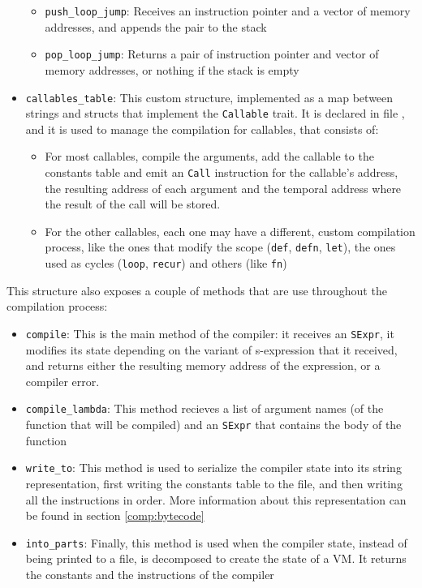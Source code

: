 \documentclass[11pt]{scrreprt}
\begin{document}
\begin{itemize}
\begin{itemize}
    \item \texttt{push\_loop\_jump}: Receives an instruction pointer and a vector of memory addresses, and appends the pair to the stack
    \item \texttt{pop\_loop\_jump}: Returns a pair of instruction pointer and vector of memory addresses, or nothing if the stack is empty
  \end{itemize}
  \item \texttt{callables\_table}: This custom structure, implemented as a map between strings and structs that implement the \texttt{Callable} trait. It is declared in file , and it is used to manage the compilation for callables, that consists of:
  \begin{itemize}
    \item For most callables, compile the arguments, add the callable to the constants table and emit an \texttt{Call} instruction for the callable's address, the resulting address of each argument and the temporal address where the result of the call will be stored.
    \item For the other callables, each one may have a different, custom compilation process, like the ones that modify the scope (\texttt{def}, \texttt{defn}, \texttt{let}), the ones used as cycles (\texttt{loop}, \texttt{recur}) and others (like \texttt{fn})
  \end{itemize}
\end{itemize}

This structure also exposes a couple of methods that are use throughout the compilation process:
\begin{itemize}
  \item \texttt{compile}: This is the main method of the compiler: it receives an \texttt{SExpr}, it modifies its state depending on the variant of s-expression that it received, and returns either the resulting memory address of the expression, or a compiler error.
  \item \texttt{compile\_lambda}: This method recieves a list of argument names (of the function that will be compiled) and an \texttt{SExpr} that contains the body of the function
  \item \texttt{write\_to}: This method is used to serialize the compiler state into its string representation, first writing the constants table to the file, and then writing all the instructions in order. More information about this representation can be found in section \ref{comp:bytecode}
  \item \texttt{into\_parts}: Finally, this method is used when the compiler state, instead of being printed to a file, is decomposed to create the state of a VM. It returns the constants and the instructions of the compiler
\end{itemize}
\end{document}
